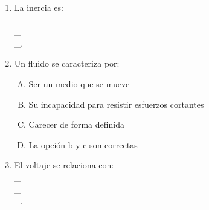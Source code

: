 \begin{enumerate}
\item  La inercia es: \label{yolf-23}\hrulefill\\
\_\hrulefill\\
\_\hrulefill\\
\_\hrulefill.


\item   Un fluido se caracteriza por: \label{yolf-24}\\

\begin{enumerate}[(A)]
\item  Ser un medio que se mueve
\item  Su incapacidad para resistir esfuerzos cortantes
\item  Carecer de forma definida
\item  La opción b y c son correctas
\end{enumerate}


\item   El voltaje se relaciona con: \label{yolf-25}\hrulefill\\
\_\hrulefill\\
\_\hrulefill\\
\_\hrulefill.




\end{enumerate}

